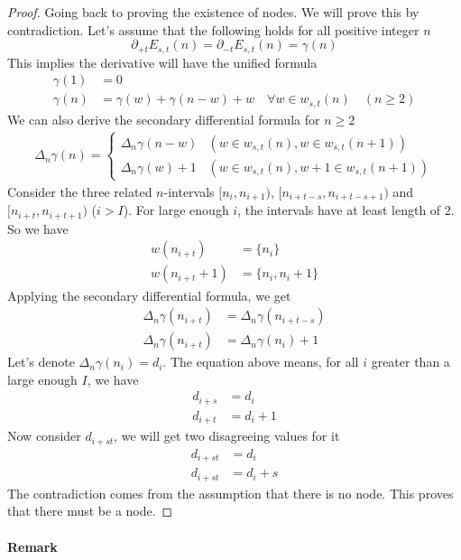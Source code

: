 \documentclass[]{article}
\begin{document}
\begin{proof}
	Going back to proving the existence of nodes. We will prove this by contradiction. Let's assume that the following holds for all positive integer $n$
	\[
	\partial_{+t}E_{s,t}(n) = \partial_{-t}E_{s,t}(n) = \gamma(n)
	\]
	This implies the derivative will have the unified formula
	\begin{align*}
	\gamma(1) &= 0\\
	\gamma(n) &= \gamma(w) + \gamma(n-w) + w\quad \forall w\in w_{s,t}(n) \quad(n\geq 2)
	\end{align*}
	We can also derive the secondary differential formula for $n\geq 2$
	\begin{align*}
	\Delta_n \gamma(n) =\begin{cases}
	\Delta_n  \gamma(n-w) & (w\in w_{s,t}(n), w\in w_{s,t}(n+1) )\\
	\Delta_n  \gamma(w) + 1 & (w\in w_{s,t}(n), w+1\in w_{s,t}(n+1) )
	\end{cases}
	\end{align*}
	Consider the three related $n$-intervals $[n_{i}, n_{i+1})$, $[n_{i + t-s}, n_{i + t-s + 1})$ and $[n_{i+t}, n_{i+t + 1})$ ($i > I$). For large enough $i$, the intervals have at least length of 2. So we have
	\begin{align*}
	w(n_{i+t}) &= \{n_{i}\}\\
	w(n_{i+t}+1) &= \{n_{i}, n_{i}+1\}
	\end{align*}
	Applying the secondary differential formula, we get
	\begin{align*}
	\Delta_n \gamma(n_{i+t}) &= \Delta_n \gamma(n_{i + t-s}) \\
	\Delta_n \gamma(n_{i+t}) &= \Delta_n \gamma(n_{i}) + 1
	\end{align*}
	Let's denote $\Delta_n \gamma(n_i) = d_i$. The equation above means, for all $i$ greater than a large enough $I$, we have
	\begin{align*}
	d_{i+s} &= d_{i}\\
	d_{i+t} &= d_{i} + 1
	\end{align*}
	Now consider $d_{i+st}$, we will get two disagreeing values for it
	\begin{align*}
	d_{i+st} & = d_{i}\\
	d_{i+st} &= d_{i} + s
	\end{align*}
	The contradiction comes from the assumption that there is no node. This proves that there must be a node.

\end{proof}

\paragraph{Remark}
\end{document}
